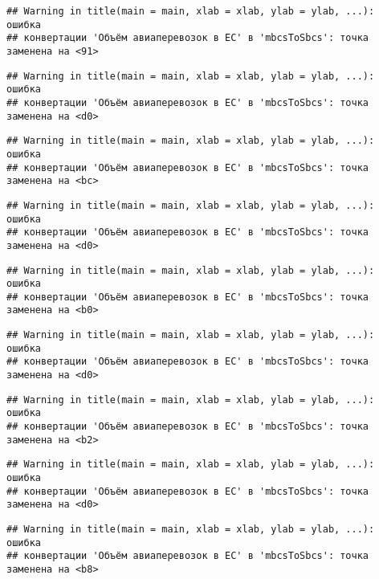 \documentclass[
]{article}
\begin{document}
\begin{verbatim}
## Warning in title(main = main, xlab = xlab, ylab = ylab, ...): ошибка
## конвертации 'Объём авиаперевозок в ЕС' в 'mbcsToSbcs': точка заменена на <91>
\end{verbatim}

\begin{verbatim}
## Warning in title(main = main, xlab = xlab, ylab = ylab, ...): ошибка
## конвертации 'Объём авиаперевозок в ЕС' в 'mbcsToSbcs': точка заменена на <d0>
\end{verbatim}

\begin{verbatim}
## Warning in title(main = main, xlab = xlab, ylab = ylab, ...): ошибка
## конвертации 'Объём авиаперевозок в ЕС' в 'mbcsToSbcs': точка заменена на <bc>
\end{verbatim}

\begin{verbatim}
## Warning in title(main = main, xlab = xlab, ylab = ylab, ...): ошибка
## конвертации 'Объём авиаперевозок в ЕС' в 'mbcsToSbcs': точка заменена на <d0>
\end{verbatim}

\begin{verbatim}
## Warning in title(main = main, xlab = xlab, ylab = ylab, ...): ошибка
## конвертации 'Объём авиаперевозок в ЕС' в 'mbcsToSbcs': точка заменена на <b0>
\end{verbatim}

\begin{verbatim}
## Warning in title(main = main, xlab = xlab, ylab = ylab, ...): ошибка
## конвертации 'Объём авиаперевозок в ЕС' в 'mbcsToSbcs': точка заменена на <d0>
\end{verbatim}

\begin{verbatim}
## Warning in title(main = main, xlab = xlab, ylab = ylab, ...): ошибка
## конвертации 'Объём авиаперевозок в ЕС' в 'mbcsToSbcs': точка заменена на <b2>
\end{verbatim}

\begin{verbatim}
## Warning in title(main = main, xlab = xlab, ylab = ylab, ...): ошибка
## конвертации 'Объём авиаперевозок в ЕС' в 'mbcsToSbcs': точка заменена на <d0>
\end{verbatim}

\begin{verbatim}
## Warning in title(main = main, xlab = xlab, ylab = ylab, ...): ошибка
## конвертации 'Объём авиаперевозок в ЕС' в 'mbcsToSbcs': точка заменена на <b8>
\end{verbatim}
\end{document}
